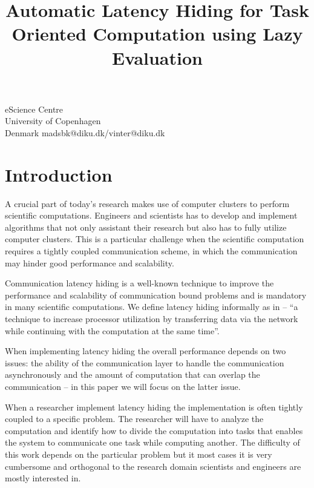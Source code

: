 \documentclass[preprint]{../PGAS10/sigplanconf}
\begin{document}


\title{Automatic Latency Hiding for Task Oriented Computation using Lazy Evaluation}

           {eScience Centre\\ University of Copenhagen\\ Denmark}
           {madsbk@diku.dk/vinter@diku.dk}

\maketitle

\begin{abstract}

\end{abstract}

\section{Introduction}
A crucial part of today’s research makes use of computer clusters to perform scientific computations. Engineers and scientists has to develop and implement algorithms that not only assistant their research but also has to fully utilize computer clusters. This is a particular challenge when the scientific computation requires a tightly coupled communication scheme, in which the communication may hinder good performance and scalability.

Communication latency hiding is a well-known technique to improve the performance and scalability of communication bound problems and is mandatory in many scientific computations. We define latency hiding informally as in \cite{Strumpen94latencyhiding} -- ``a technique to increase processor utilization by transferring data via the network while continuing with the computation at the same time''.

When implementing latency hiding the overall performance depends on two issues: the ability of the communication layer to handle the communication asynchronously and the amount of computation that can overlap the communication -- in this paper we will focus on the latter issue.

When a researcher implement latency hiding the implementation is often tightly coupled to a specific problem. The researcher will have to analyze the computation and identify how to divide the computation into tasks that enables the system to communicate one task while computing another. The difficulty of this work depends on the particular problem but it most cases it is very cumbersome and orthogonal to the research domain scientists and engineers are mostly interested in.
\end{document}
